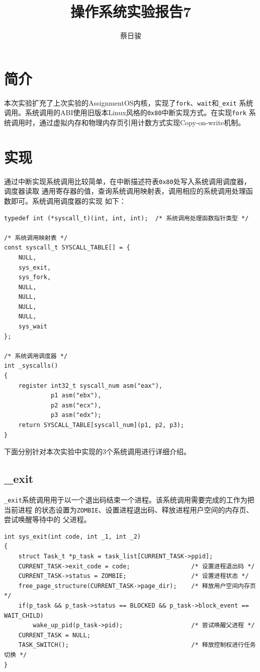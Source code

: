 \documentclass[a4paper, adobefonts]{ctexart}
\title{操作系统实验报告7}
\author{蔡日骏\quad12348003}
\begin{document}
\maketitle

\section{简介}
本次实验扩充了上次实验的AssignmentOS内核，实现了\verb|fork|、\verb|wait|和\verb|_exit|
系统调用。系统调用的ABI使用旧版本Linux风格的\verb|0x80|中断实现方式。在实现\verb|fork|
系统调用时，通过虚拟内存和物理内存页引用计数方式实现Copy-on-write机制。

\section{实现}

通过中断实现系统调用比较简单，在中断描述符表\verb|0x80|处写入系统调用调度器，调度器读取
通用寄存器的值，查询系统调用映射表，调用相应的系统调用处理函数即可。系统调用调度器的实现
如下：

\begin{verbatim}
typedef int (*syscall_t)(int, int, int);  /* 系统调用处理函数指针类型 */

/* 系统调用映射表 */
const syscall_t SYSCALL_TABLE[] = {
    NULL,
    sys_exit,
    sys_fork,
    NULL,
    NULL,
    NULL,
    NULL,
    sys_wait
};

/* 系统调用调度器 */
int _syscalls()
{
    register int32_t syscall_num asm("eax"),
             p1 asm("ebx"),
             p2 asm("ecx"),
             p3 asm("edx");
    return SYSCALL_TABLE[syscall_num](p1, p2, p3);
}
\end{verbatim}

下面分别针对本次实验中实现的3个系统调用进行详细介绍。

\subsection{\_exit}
\verb|_exit|系统调用用于以一个退出码结束一个进程。该系统调用需要完成的工作为把当前进程
的状态设置为\verb|ZOMBIE|、设置进程退出码、释放进程用户空间的内存页、尝试唤醒等待中的
父进程。

\begin{verbatim}
int sys_exit(int code, int _1, int _2)
{
    struct Task_t *p_task = task_list[CURRENT_TASK->ppid];
    CURRENT_TASK->exit_code = code;                 /* 设置进程退出码 */
    CURRENT_TASK->status = ZOMBIE;                  /* 设置进程状态 */
    free_page_structure(CURRENT_TASK->page_dir);    /* 释放用户空间内存页 */
    if(p_task && p_task->status == BLOCKED && p_task->block_event == WAIT_CHILD)
        wake_up_pid(p_task->pid);                   /* 尝试唤醒父进程 */
    CURRENT_TASK = NULL;
    TASK_SWITCH();                                  /* 释放控制权进行任务切换 */
}
\end{verbatim}
\end{document}
